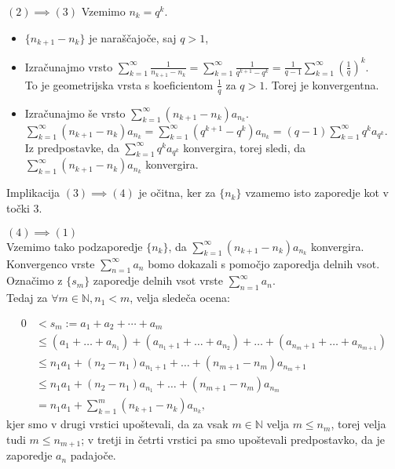 \documentclass[a4paper,12pt]{article}
\def\N{\mathbb{N}} %
\begin{document}
\noindent
$(2) \implies (3)$ Vzemimo ${n_k} = q^k$.\\

\begin{itemize}
    \item $\{n_{k+1} - n_k\}$ je naraščajoče, saj $ q > 1$,
    \item Izračunajmo vrsto
    $\sum_{k = 1}^{\infty}{\frac{1}{n_{k+1} - n_k}} = 
    \sum_{k = 1}^{\infty}{\frac{1}{q^{k + 1} - q^k}} =
    \frac{1}{q - 1}\sum_{k = 1}^{\infty}{(\frac{1}{q})^k}$.\\
    To je geometrijska vrsta s koeficientom $\frac{1}{q}$ za $q > 1$. Torej je konvergentna.
    \item Izračunajmo še vrsto $\sum_{k = 1}^{\infty}{(n_{k+1} - n_k)a_{n_k}}$.\\
    $\sum_{k = 1}^{\infty}{(n_{k+1} - n_k)a_{n_k}} =
    \sum_{k = 1}^{\infty}{(q^{k + 1} - q^k)}a_{n_k} =
    (q - 1)\sum_{k = 1}^{\infty}{q^ka_{q^k}}$.\\
    Iz predpostavke, da $\sum_{k = 1}^{\infty}{q^ka_{q^k}}$ konvergira, torej sledi,
    da $\sum_{k = 1}^{\infty}{(n_{k+1} - n_k)a_{n_k}}$ konvergira.
\end{itemize}


\noindent
Implikacija $(3) \implies (4)$ je očitna, ker za $\{n_k\}$ vzamemo isto zaporedje kot v točki 3.

\noindent
$(4) \implies (1)$\\
Vzemimo tako podzaporedje  $\{n_k\}$, da $\sum_{k = 1}^{\infty}{(n_{k+1} - n_k)a_{n_k}}$ konvergira.
Konvergenco vrste $\sum_{n = 1}^{\infty}{a_n}$ bomo dokazali s pomočjo zaporedja delnih vsot.
Označimo z $\{s_m\}$ zaporedje delnih vsot vrste $\sum_{n = 1}^{\infty}{a_n}$.\\
Tedaj za $\forall m \in \N, n_1 < m$, velja sledeča ocena:

\[
    \begin{split}
        0 & < s_m := a_1 + a_2 + \cdots + a_m \\
        & \leq (a_1 + \ldots + a_{n_1}) + (a_{n_{1} + 1} + \ldots + a_{n_{2}})
        + \ldots  + (a_{n_{m} + 1} + \ldots + a_{n_{m+1}})\\
        & \leq n_{1}a_{1} + (n_2 - n_1)a_{n_{1} + 1} + \ldots + (n_{m+1} - n_m)a_{n_{m}+1}\\
        & \leq n_{1}a_{1} + (n_2 - n_1)a_{n_1} + \ldots + (n_{m+1} - n_{m})a_{n_{m}}\\
        & = n_{1}a_{1} + \sum_{k = 1}^{m}{(n_{k+1} - n_k)a_{n_k}} \text{,}
    \end{split}
\]
kjer smo v drugi vrstici upoštevali, da za vsak $m \in \N$ velja $m \leq n_m$, 
torej velja tudi $m \leq n_{m + 1}$; v tretji in četrti vrstici pa smo upoštevali predpostavko,
da je zaporedje $a_n$ padajoče.
\end{document}
